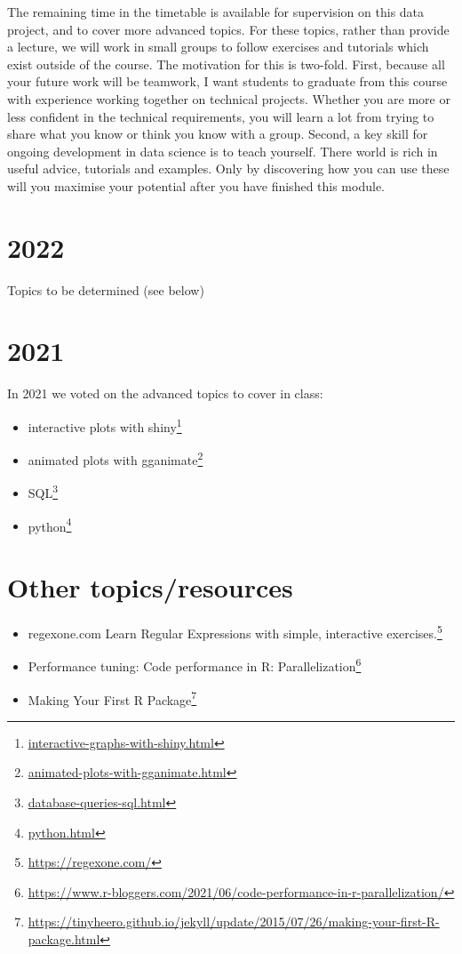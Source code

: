 \documentclass[
  12pt,
  a5paper,
]{book}
\DeclareRobustCommand{\href}[2]{#2\footnote{\url{#1}}}
\providecommand{\tightlist}{%
  \setlength{\itemsep}{0pt}\setlength{\parskip}{0pt}}
\begin{document}
The remaining time in the timetable is available for supervision on this data project, and to cover more advanced topics. For these topics, rather than provide a lecture, we will work in small groups to follow exercises and tutorials which exist outside of the course. The motivation for this is two-fold. First, because all your future work will be teamwork, I want students to graduate from this course with experience working together on technical projects. Whether you are more or less confident in the technical requirements, you will learn a lot from trying to share what you know or think you know with a group. Second, a key skill for ongoing development in data science is to teach yourself. There world is rich in useful advice, tutorials and examples. Only by discovering how you can use these will you maximise your potential after you have finished this module.

\hypertarget{section}{%
\section{2022}\label{section}}

Topics to be determined (see below)

\hypertarget{section-1}{%
\section{2021}\label{section-1}}

In 2021 we voted on the advanced topics to cover in class:

\begin{itemize}
\tightlist
\item
  \href{interactive-graphs-with-shiny.html}{interactive plots with shiny}
\item
  \href{animated-plots-with-gganimate.html}{animated plots with gganimate}
\item
  \href{database-queries-sql.html}{SQL}
\item
  \href{python.html}{python}
\end{itemize}

\hypertarget{other-topicsresources}{%
\section{Other topics/resources}\label{other-topicsresources}}

\begin{itemize}
\tightlist
\item
  regexone.com \href{https://regexone.com/}{Learn Regular Expressions with simple, interactive exercises.}
\item
  Performance tuning: \href{https://www.r-bloggers.com/2021/06/code-performance-in-r-parallelization/}{Code performance in R: Parallelization}
\item
  \href{https://tinyheero.github.io/jekyll/update/2015/07/26/making-your-first-R-package.html}{Making Your First R Package}
\end{itemize}
\end{document}
